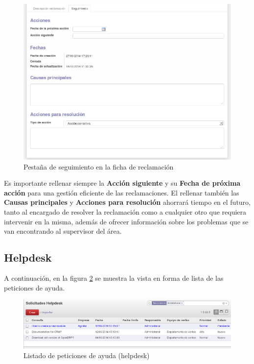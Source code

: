 \begin{figure}[H]
\includegraphics[width=\textwidth]{ventas/img/ven_recseguimiento.png}
\caption{Pestaña de seguimiento en la ficha de reclamación}
\label{ven:recseguimiento}
\end{figure}

Es importante rellenar siempre la \textbf{Acción siguiente} y su \textbf{Fecha de próxima acción} para una gestión eficiente de las 
reclamaciones. El rellenar también las \textbf{Causas principales} y \textbf{Acciones para resolución} ahorrará tiempo en el futuro, tanto
al encargado de resolver la reclamación como a cualquier otro que requiera intervenir en la misma, además de ofrecer información sobre
los problemas que se van encontrando al supervisor del área.

\subsection{Helpdesk}
A continuación, en la figura \ref{ven:hellistado} se muestra la vista en forma de lista de las peticiones de ayuda.

\begin{figure}[H]
\includegraphics[width=\textwidth]{ventas/img/ven_hellistado.png}
\caption{Listado de peticiones de ayuda (helpdesk)}
\label{ven:hellistado}
\end{figure}

